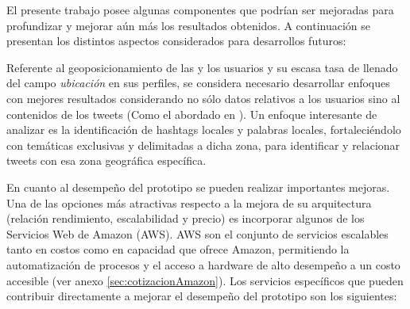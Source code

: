 El presente trabajo posee algunas componentes que podrían ser mejoradas para profundizar y mejorar aún más los resultados obtenidos. A continuación se presentan los distintos aspectos considerados para desarrollos futuros:

Referente al geoposicionamiento de las y los usuarios y su escasa tasa de llenado del campo \emph{ubicación} en sus perfiles, se considera necesario desarrollar enfoques con mejores resultados considerando no sólo datos relativos a los usuarios sino al contenidos de los tweets (Como el abordado en \cite{Cheng:2010:YYT:1871437.1871535} \cite{doi:10.1080/00330124.2014.907699} \cite{Dredze_carmen:a} \cite{GraellsGarridoP13}). Un enfoque interesante de analizar es la identificación de hashtags locales y palabras locales, fortaleciéndolo con temáticas exclusivas y delimitadas a dicha zona, para identificar y relacionar tweets con esa zona geográfica específica.

	En cuanto al desempeño del prototipo se pueden realizar importantes mejoras. Una de las opciones más atractivas respecto a la mejora de su arquitectura (relación rendimiento, escalabilidad y precio) es incorporar algunos de los Servicios Web de Amazon (AWS). AWS son el conjunto de servicios escalables tanto en costos como en capacidad que ofrece Amazon, permitiendo la automatización de procesos y el acceso a hardware de alto desempeño a un costo accesible (ver anexo \ref{sec:cotizacionAmazon}). Los servicios específicos que pueden contribuir directamente a mejorar el desempeño del prototipo son los siguientes:
	
